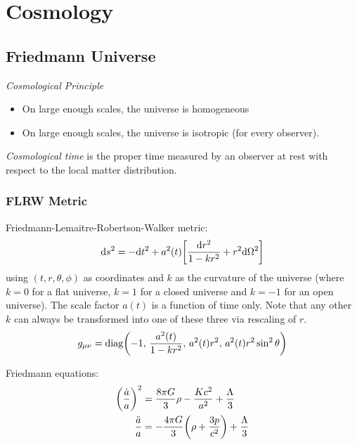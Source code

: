 \section{Cosmology}
	\subsection{Friedmann Universe}
		\emph{Cosmological Principle}
		\begin{itemize}
			\item On large enough scales, the universe is homogeneous
			\item On large enough scales, the universe is isotropic (for every observer).
		\end{itemize}

		\noindent
		\emph{Cosmological time} is the proper time measured by an observer at rest with respect to the local matter distribution.

		\subsubsection{FLRW Metric}
			Friedmann-Lemaitre-Robertson-Walker metric:
			\begin{equation}
				\dd s^2 = -\dd t^2 + a^2(t) \qty[\frac{\dd r^2}{1-kr^2} + r^2 \dd \Omega^2]
			\end{equation}
			using $(t, r, \theta, \phi)$ as coordinates and $k$ as the curvature of the universe (where $k=0$ for a flat universe, $k=1$ for a closed universe and $k=-1$ for an open universe). The scale factor $a(t)$ is a function of time only. Note that any other $k$ can always be transformed into one of these three via rescaling of $r$.
			\begin{equation}
				g_{\mu\nu} = \mathrm{diag}\qty(-1,\, \frac{a^2(t)}{1-kr^2},\, a^2(t) r^2,\, a^2(t) r^2 \sin^2 \theta)
			\end{equation}

			\noindent
			Friedmann equations:
			\begin{equation}
				\begin{aligned}
					\qty(\frac{\dot{a}}{a})^2 &= \frac{8 \pi G}{3} \rho - \frac{K c^2}{a^2} + \frac{\Lambda}{3} \\
					\frac{\ddot{a}}{a} &= -\frac{4 \pi G}{3} \qty(\rho + \frac{3p}{c^2}) + \frac{\Lambda}{3} \\
				\end{aligned}
			\end{equation}

